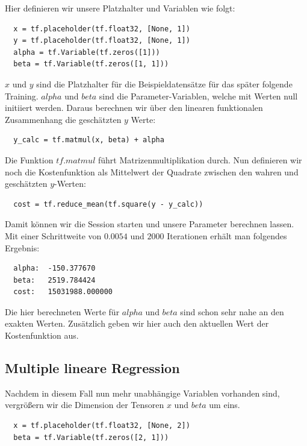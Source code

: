 Hier definieren wir unsere Platzhalter und Variablen wie folgt:

\begin{verbatim}
  x = tf.placeholder(tf.float32, [None, 1])
  y = tf.placeholder(tf.float32, [None, 1])
  alpha = tf.Variable(tf.zeros([1]))
  beta = tf.Variable(tf.zeros([1, 1]))
\end{verbatim}

$x$ und $y$ sind die Platzhalter für die Beispieldatensätze für das später folgende Training. $alpha$ und $beta$ sind die Parameter-Variablen, welche mit Werten null initiiert werden. Daraus berechnen wir über den linearen funktionalen Zusammenhang die geschätzten $y$ Werte:

\begin{verbatim}
  y_calc = tf.matmul(x, beta) + alpha
\end{verbatim}

Die Funktion $tf.matmul$ führt Matrizenmultiplikation durch. Nun definieren wir noch die Kostenfunktion als Mittelwert der Quadrate zwischen den wahren und geschätzten $y$-Werten:

\begin{verbatim}
  cost = tf.reduce_mean(tf.square(y - y_calc))
\end{verbatim}

Damit können wir die Session starten und unsere Parameter berechnen lassen. Mit einer Schrittweite von $0.0054$ und $2000$ Iterationen erhält man folgendes Ergebnis:

\begin{verbatim}
  alpha:  -150.377670
  beta:   2519.784424
  cost:   15031988.000000
\end{verbatim}

Die hier berechneten Werte für $alpha$ und $beta$ sind schon sehr nahe an den exakten Werten. Zusätzlich geben wir hier auch den aktuellen Wert der Kostenfunktion aus.

\subsection{Multiple lineare Regression}
\label{subsection:3:3:3}

Nachdem in diesem Fall nun mehr unabhängige Variablen vorhanden sind, vergrößern wir die Dimension der Tensoren $x$ und $beta$ um eins.

\begin{verbatim}
  x = tf.placeholder(tf.float32, [None, 2])
  beta = tf.Variable(tf.zeros([2, 1]))
\end{verbatim}

